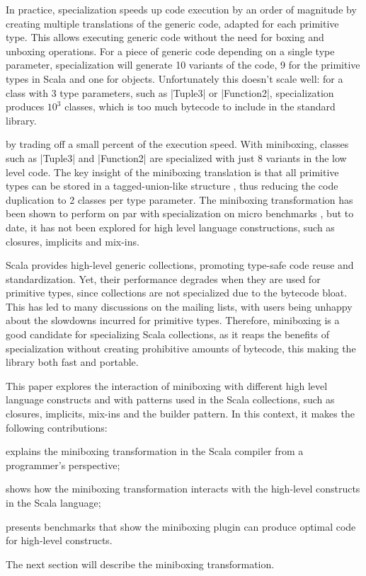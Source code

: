  In practice, specialization speeds up code execution by an order of magnitude \cite{erik-spire} by creating multiple translations of the generic code, adapted for each primitive type. This allows executing generic code without the need for boxing and unboxing operations. For a piece of generic code depending on a single type parameter, specialization will generate 10 variants of the code, 9 for the primitive types in Scala and one for objects. Unfortunately this doesn't scale well: for a class with 3 type parameters, such as |Tuple3| or |Function2|, specialization produces $10^3$ classes, which is too much bytecode to include in the standard library.

 by trading off a small percent of the execution speed. With miniboxing, classes such as |Tuple3| and |Function2| are specialized with just 8 variants in the low level code. The key insight of the miniboxing translation is that all primitive types can be stored in a tagged-union-like structure \cite{tagged-unions-lua}, thus reducing the code duplication to 2 classes per type parameter. The miniboxing transformation has been shown to perform on par with specialization on micro benchmarks \cite{miniboxing}, but to date, it has not been explored for high level language constructions, such as closures, implicits and mix-ins.

Scala provides high-level generic collections, promoting type-safe code reuse and standardization. Yet, their performance degrades when they are used for primitive types, since collections are not specialized due to the bytecode bloat. This has led to many discussions on the mailing lists, with users being unhappy about the slowdowns incurred for primitive types. Therefore, miniboxing is a good candidate for specializing Scala collections, as it reaps the benefits of specialization without creating prohibitive amounts of bytecode, this making the library both fast and portable.

This paper explores the interaction of miniboxing with different high level language constructs and with patterns used in the Scala collections, such as closures, implicits, mix-ins and the builder pattern. In this context, it makes the following contributions:

\begin{packed_item}
\item explains the miniboxing transformation in the Scala compiler from a programmer's perspective;
\item shows how the miniboxing transformation interacts with the high-level constructs in the Scala language;
\item presents benchmarks that show the miniboxing plugin can produce optimal code for high-level constructs.
\end{packed_item}

The next section will describe the miniboxing transformation. 